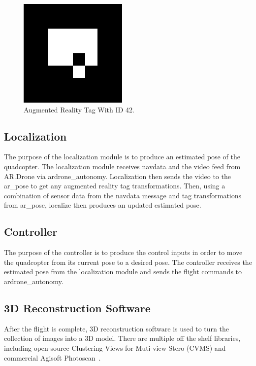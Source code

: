         \begin{figure}[ht]
                \centering
        		\includegraphics[width=200px]{../images/artag.png}
                \caption{Augmented Reality Tag With ID 42.}\label{fig:artag}
        \end{figure}


    \subsection{Localization}
        The purpose of the localization module is to produce an estimated pose of the quadcopter. The localization module receives navdata and the video feed from AR.Drone via ardrone\_autonomy. Localization then sends the video to the ar\_pose to get any augmented reality tag transformations. Then, using a combination of sensor data from the navdata message and tag transformations from ar\_pose, localize then produces an updated estimated pose.

    \subsection{Controller}
        The purpose of the controller is to produce the control inputs in order to move the quadcopter from its current pose to a desired pose. The controller receives the estimated pose from the localization module and sends the flight commands to ardrone\_autonomy.

    \subsection{3D Reconstruction Software}
        After the flight is complete, 3D reconstruction software is used to turn the collection of images into a 3D model. There are multiple off the shelf libraries, including open-source Clustering Views for Muti-view Stero (CVMS) and commercial Agisoft Photoscan~\cite{CMVS, Agisoft}. 

